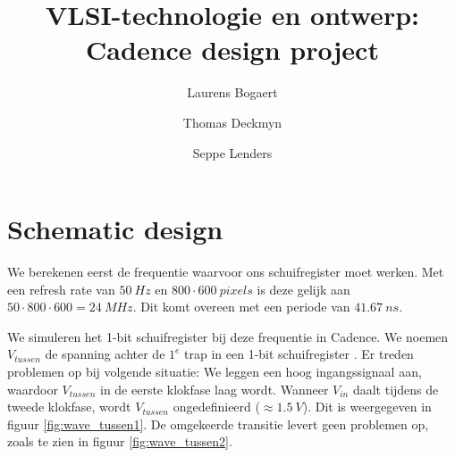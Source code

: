\documentclass[11pt,a4paper,oneside,dutch]{article}
\author{Laurens Bogaert \and Thomas Deckmyn \and Seppe Lenders}
\title{VLSI-technologie en ontwerp: Cadence design project}
\date{\vspace{-5ex}} %
\begin{document}
\maketitle{}

\section{Schematic design}

We berekenen eerst de frequentie waarvoor ons schuifregister moet werken. Met een refresh rate van $\SI{50}{Hz}$ en $800 \cdot \SI{600}{pixels}$ is deze gelijk aan $50 \cdot 800 \cdot 600 = \SI{24}{MHz}$. Dit komt overeen met een periode van $\SI{41,67}{ns}$.

We simuleren het 1-bit schuifregister bij deze frequentie in Cadence. We noemen $V_{tussen}$ de spanning achter de $1^{e}$ trap in een 1-bit schuifregister . Er treden problemen op bij volgende situatie: We leggen een hoog ingangssignaal aan, waardoor $V_{tussen}$ in de eerste klokfase laag wordt. Wanneer $V_{in}$ daalt tijdens de tweede klokfase, wordt $V_{tussen}$ ongedefinieerd ($\approx \SI{1,5}{V}$). Dit is weergegeven in figuur \ref{fig:wave_tussen1}. De omgekeerde transitie levert geen problemen op, zoals te zien in figuur \ref{fig:wave_tussen2}.
\end{document}
